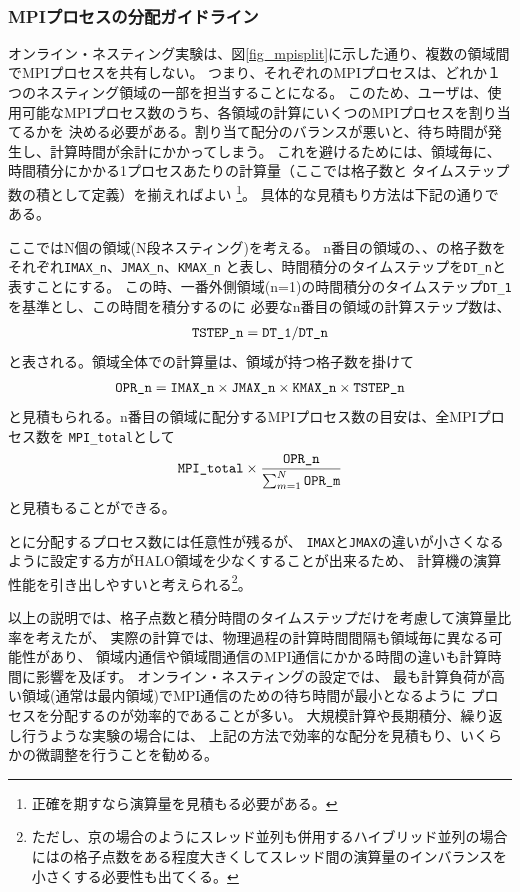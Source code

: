 \\



\subsubsection{MPIプロセスの分配ガイドライン}
オンライン・ネスティング実験は、図\ref{fig_mpisplit}に示した通り、複数の領域間でMPIプロセスを共有しない。
つまり、それぞれのMPIプロセスは、どれか１つのネスティング領域の一部を担当することになる。
このため、ユーザは、使用可能なMPIプロセス数のうち、各領域の計算にいくつのMPIプロセスを割り当てるかを
決める必要がある。割り当て配分のバランスが悪いと、待ち時間が発生し、計算時間が余計にかかってしまう。
これを避けるためには、領域毎に、時間積分にかかる1プロセスあたりの計算量（ここでは格子数と
タイムステップ数の積として定義）を揃えればよい
\footnote{正確を期すなら演算量を見積もる必要がある。}。
具体的な見積もり方法は下記の通りである。

ここではN個の領域(N段ネスティング)を考える。
n番目の領域の{\XDIR}、{\YDIR}、{\ZDIR}の格子数をそれぞれ\verb|IMAX_n|、\verb|JMAX_n|、\verb|KMAX_n|
と表し、時間積分のタイムステップを\verb|DT_n|と表すことにする。
この時、一番外側領域(n=1)の時間積分のタイムステップ\verb|DT_1|を基準とし、この時間を積分するのに
必要なn番目の領域の計算ステップ数は、
\begin{eqnarray}
 \verb|TSTEP_n| = \verb|DT_1| / \verb|DT_n|  \nonumber
\end{eqnarray}
と表される。領域全体での計算量は、領域が持つ格子数を掛けて
\begin{eqnarray}
 \verb|OPR_n| = \verb|IMAX_n| \times \verb|JMAX_n| \times \verb|KMAX_n| \times \verb|TSTEP_n| \nonumber
\end{eqnarray}
と見積もられる。n番目の領域に配分するMPIプロセス数の目安は、全MPIプロセス数を \verb|MPI_total|として
\begin{eqnarray}
 \verb|MPI_total| \times \frac{ \texttt{OPR\_n} }{ \sum_{m=1}^N \texttt{OPR\_m} }
\end{eqnarray}
と見積もることができる。


{\XDIR} と{\YDIR}に分配するプロセス数には任意性が残るが、
\verb|IMAX|と\verb|JMAX|の違いが小さくなるように設定する方がHALO領域を少なくすることが出来るため、
計算機の演算性能を引き出しやすいと考えられる\footnote{ただし、京の場合のようにスレッド並列も併用するハイブリッド並列の場合には{\YDIR}の格子点数をある程度大きくしてスレッド間の演算量のインバランスを小さくする必要性も出てくる。}。


以上の説明では、格子点数と積分時間のタイムステップだけを考慮して演算量比率を考えたが、
実際の計算では、物理過程の計算時間間隔も領域毎に異なる可能性があり、
領域内通信や領域間通信のMPI通信にかかる時間の違いも計算時間に影響を及ぼす。
オンライン・ネスティングの設定では、
最も計算負荷が高い領域(通常は最内領域)でMPI通信のための待ち時間が最小となるように
プロセスを分配するのが効率的であることが多い。
大規模計算や長期積分、繰り返し行うような実験の場合には、
上記の方法で効率的な配分を見積もり、いくらかの微調整を行うことを勧める。



